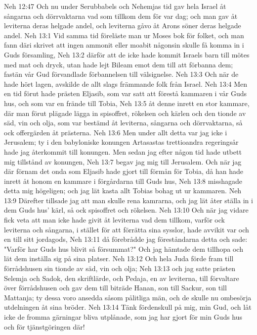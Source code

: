 Neh 12:47  Och nu under Serubbabels och Nehemjas tid gav hela Israel åt sångarna och dörrvaktarna vad som tillkom dem för var dag; och man gav åt leviterna deras helgade andel, och leviterna gåvo åt Arons söner deras helgade andel.
Neh 13:1  Vid samma tid föreläste man ur Moses bok för folket, och man fann däri skrivet att ingen ammonit eller moabit någonsin skulle få komma in i Guds församling,
Neh 13:2  därför att de icke hade kommit Israels barn till mötes med mat och dryck, utan hade lejt Bileam emot dem till att förbanna dem; fastän vår Gud förvandlade förbannelsen till välsignelse.
Neh 13:3  Och när de hade hört lagen, avskilde de allt slags främmande folk från Israel.
Neh 13:4  Men en tid förut hade prästen Eljasib, som var satt att förestå kammaren i vår Guds hus, och som var en frände till Tobia,
Neh 13:5  åt denne inrett en stor kammare, där man förut plägade lägga in spisoffret, rökelsen och kärlen och den tionde av säd, vin och olja, som var bestämd åt leviterna, sångarna och dörrvaktarna, så ock offergärden åt prästerna.
Neh 13:6  Men under allt detta var jag icke i Jerusalem; ty i den babyloniske konungen Artasastas trettioandra regeringsår hade jag återkommit till konungen. Men sedan jag efter någon tid hade utbett mig tillstånd av konungen,
Neh 13:7  begav jag mig till Jerusalem. Och när jag där förnam det onda som Eljasib hade gjort till förmån för Tobia, då han hade inrett åt honom en kammare i förgårdarna till Guds hus,
Neh 13:8  misshagade detta mig högeligen; och jag lät kasta allt Tobias bohag ut ur kammaren.
Neh 13:9  Därefter tillsade jag att man skulle rena kamrarna, och jag lät åter ställa in i dem Guds hus' kärl, så ock spisoffret och rökelsen.
Neh 13:10  Och när jag vidare fick veta att man icke hade givit åt leviterna vad dem tillkom, varför ock leviterna och sångarna, i stället för att förrätta sina sysslor, hade avvikit var och en till sitt jordagods,
Neh 13:11  då förebrådde jag föreståndarna detta och sade: "Varför har Guds hus blivit så försummat?" Och jag hämtade dem tillhopa och lät dem inställa sig på sina platser.
Neh 13:12  Och hela Juda förde fram till förrådshusen sin tionde av säd, vin och olja;
Neh 13:13  och jag satte prästen Selemja och Sadok, den skriftlärde, och Pedaja, en av leviterna, till förvaltare över förrådshusen och gav dem till biträde Hanan, son till Sackur, son till Mattanja; ty dessa voro ansedda såsom pålitliga män, och de skulle nu ombesörja utdelningen åt sina bröder.
Neh 13:14  Tänk fördenskull på mig, min Gud, och låt icke de fromma gärningar bliva utplånade, som jag har gjort för min Guds hus och för tjänstgöringen där!
